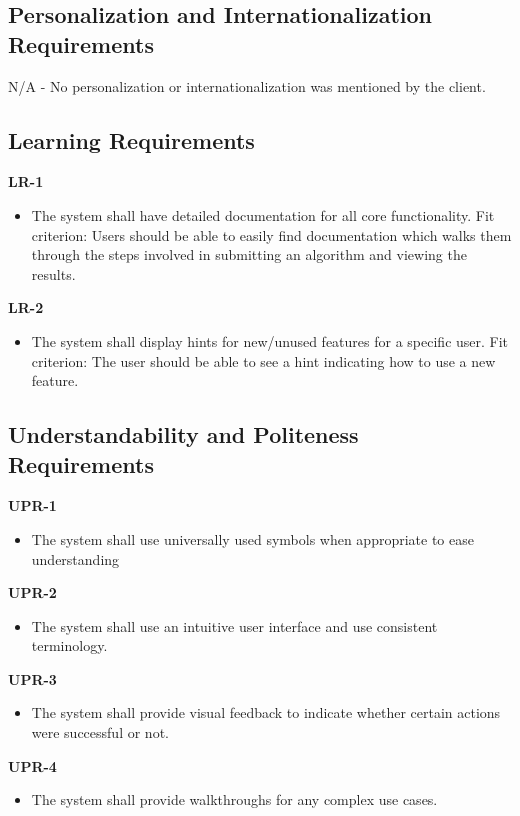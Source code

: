 \documentclass[12pt]{article}
\begin{document}
\subsection{Personalization and Internationalization Requirements}
N/A - No personalization or internationalization was mentioned by the client.
\subsection{Learning Requirements}
\textbf{LR-1}
\begin{itemize}
    \item The system shall have detailed documentation for all core functionality. \hfill \break
    Fit criterion: Users should be able to easily find documentation which walks them through the steps involved in submitting an algorithm and viewing the results.
\end{itemize}
\textbf{LR-2}
\begin{itemize}
    \item The system shall display hints for new/unused features for a specific user. \hfill \break
    Fit criterion: The user should be able to see a hint indicating how to use a new feature.
\end{itemize}

\subsection{Understandability and Politeness Requirements}
\textbf{UPR-1}
\begin{itemize}
    \item The system shall use universally used symbols when appropriate to ease understanding
\end{itemize}
\textbf{UPR-2}
\begin{itemize}
    \item The system shall use an intuitive user interface and use consistent terminology.
\end{itemize}
\textbf{UPR-3}
\begin{itemize}
    \item The system shall provide visual feedback to indicate whether certain actions were successful or not.
\end{itemize}
\textbf{UPR-4}
\begin{itemize}
    \item The system shall provide walkthroughs for any complex use cases.
\end{itemize}
\end{document}
